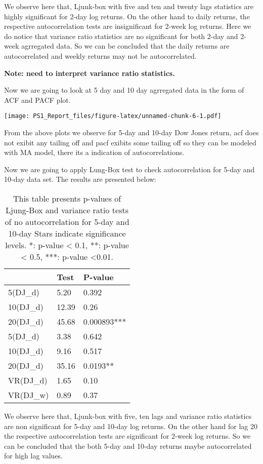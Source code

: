 \documentclass[
]{article}
\begin{document}
We observe here that, Ljunk-box with five and ten and twenty lags
statistics are highly significant for 2-day log returns. On the other
hand to daily returns, the respective autocorrelation tests are
insignificant for 2-week log returns. Here we do notice that variance
ratio statistics are no significant for both 2-day and 2-week agrregated
data. So we can be concluded that the daily returns are autocorrelated
and weekly returns may not be autocorrelated.

\textbf{Note: need to interpret variance ratio statistics.}

Now we are going to look at 5 day and 10 day agrregated data in the form
of ACF and PACF plot.

\texttt{[image: PS1\_Report\_files/figure-latex/unnamed-chunk-6-1.pdf]}

From the above plots we observe for 5-day and 10-day Dow Jones return,
acf does not exibit any tailing off and pacf exibits some tailing off so
they can be modeled with MA model, there its a indication of
autocorrelations.

Now we are going to apply Lung-Box test to check autocorrelation for
5-day and 10-day data set. The results are presented below:

\begin{table}

\caption{\label{tab:unnamed-chunk-7}This table presents p-values of Ljung-Box and variance ratio tests of no autocorrelation for 5-day and 10-day Stars indicate significance levels. *: p-value < 0.1, **: p-value < 0.5, ***: p-value <0.01.}
\centering
\begin{tabular}[t]{l|l|l}
\hline
  & Test & P-value\\
\hline
5(DJ\_d) & 5.20 & 0.392\\
\hline
10(DJ\_d) & 12.39 & 0.26\\
\hline
20(DJ\_d) & 45.68 & 0.000893***\\
\hline
5(DJ\_d) & 3.38 & 0.642\\
\hline
10(DJ\_d) & 9.16 & 0.517\\
\hline
20(DJ\_d) & 35.16 & 0.0193**\\
\hline
VR(DJ\_d) & 1.65 & 0.10\\
\hline
VR(DJ\_w) & 0.89 & 0.37\\
\hline
\end{tabular}
\end{table}

We observe here that, Ljunk-box with five, ten lags and variance ratio
statistics are non significant for 5-day and 10-day log returns. On the
other hand for lag 20 the respective autocorrelation tests are
significant for 2-week log returns. So we can be concluded that the both
5-day and 10-day returns maybe autocorrelated for high lag values.
\end{document}
